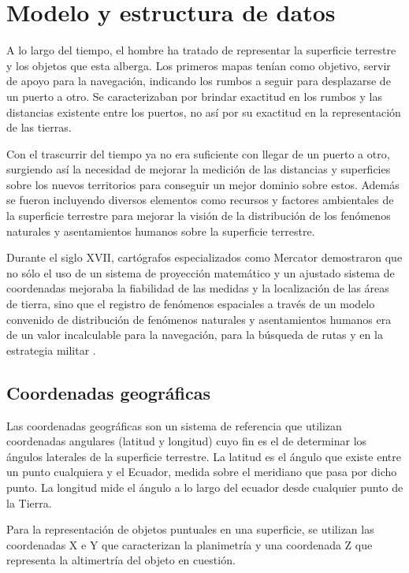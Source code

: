 \section{Modelo y estructura de datos}
\label{sec:cap2-modelo-estructura-datos}

A lo largo del tiempo, el hombre ha tratado de representar la superficie terrestre y los objetos que esta alberga.
Los primeros mapas tenían como objetivo, servir de apoyo para la navegación, indicando los rumbos a seguir para
desplazarse de un puerto a otro. Se caracterizaban por brindar exactitud en los rumbos y las distancias existente 
entre los puertos, no así por su exactitud en la representación de las tierras.

Con el trascurrir del tiempo ya no era suficiente con llegar de un puerto a otro, surgiendo así la necesidad de mejorar
la medición de las distancias y superficies sobre los nuevos territorios para conseguir un mejor dominio 
sobre estos. Además se fueron incluyendo diversos elementos como recursos y factores ambientales de la superficie
terrestre para mejorar la visión de la distribución de los fenómenos naturales y asentamientos humanos sobre 
la superficie terrestre.

Durante el siglo XVII, cartógrafos especializados como Mercator demostraron que no sólo el uso de un sistema de
proyección matemático y un ajustado sistema de coordenadas mejoraba la fiabilidad de las medidas y la localización de
las áreas de tierra, sino que el registro de fenómenos espaciales a través de un modelo convenido de distribución de
fenómenos naturales y asentamientos humanos era de un valor incalculable para la navegación, para la búsqueda de rutas
y en la estrategia militar \cite{llopis2006sistemas}.

\subsection{Coordenadas geográficas}
Las coordenadas geográficas son un sistema de referencia que utilizan coordenadas angulares (latitud y longitud) 
cuyo fin es el de determinar los ángulos laterales de la superficie terrestre. La latitud es el ángulo que existe
entre un punto cualquiera y el Ecuador, medida sobre el meridiano que pasa por dicho punto. La longitud mide el ángulo 
a lo largo del ecuador desde cualquier punto de la Tierra.

Para la representación de objetos puntuales en una superficie, se utilizan las coordenadas X e Y que caracterizan la 
planimetría y una coordenada Z que representa la altimertría del objeto en cuestión. 

